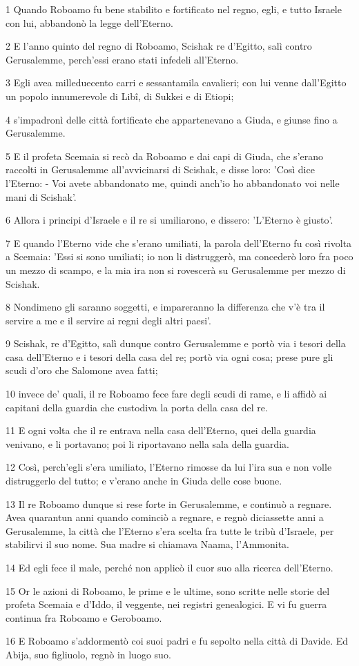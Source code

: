 \par 1 Quando Roboamo fu bene stabilito e fortificato nel regno, egli, e tutto Israele con lui, abbandonò la legge dell'Eterno.
\par 2 E l'anno quinto del regno di Roboamo, Scishak re d'Egitto, salì contro Gerusalemme, perch'essi erano stati infedeli all'Eterno.
\par 3 Egli avea milleduecento carri e sessantamila cavalieri; con lui venne dall'Egitto un popolo innumerevole di Libî, di Sukkei e di Etiopi;
\par 4 s'impadronì delle città fortificate che appartenevano a Giuda, e giunse fino a Gerusalemme.
\par 5 E il profeta Scemaia si recò da Roboamo e dai capi di Giuda, che s'erano raccolti in Gerusalemme all'avvicinarsi di Scishak, e disse loro: 'Così dice l'Eterno: - Voi avete abbandonato me, quindi anch'io ho abbandonato voi nelle mani di Scishak'.
\par 6 Allora i principi d'Israele e il re si umiliarono, e dissero: 'L'Eterno è giusto'.
\par 7 E quando l'Eterno vide che s'erano umiliati, la parola dell'Eterno fu così rivolta a Scemaia: 'Essi si sono umiliati; io non li distruggerò, ma concederò loro fra poco un mezzo di scampo, e la mia ira non si rovescerà su Gerusalemme per mezzo di Scishak.
\par 8 Nondimeno gli saranno soggetti, e impareranno la differenza che v'è tra il servire a me e il servire ai regni degli altri paesi'.
\par 9 Scishak, re d'Egitto, salì dunque contro Gerusalemme e portò via i tesori della casa dell'Eterno e i tesori della casa del re; portò via ogni cosa; prese pure gli scudi d'oro che Salomone avea fatti;
\par 10 invece de' quali, il re Roboamo fece fare degli scudi di rame, e li affidò ai capitani della guardia che custodiva la porta della casa del re.
\par 11 E ogni volta che il re entrava nella casa dell'Eterno, quei della guardia venivano, e li portavano; poi li riportavano nella sala della guardia.
\par 12 Così, perch'egli s'era umiliato, l'Eterno rimosse da lui l'ira sua e non volle distruggerlo del tutto; e v'erano anche in Giuda delle cose buone.
\par 13 Il re Roboamo dunque si rese forte in Gerusalemme, e continuò a regnare. Avea quarantun anni quando cominciò a regnare, e regnò diciassette anni a Gerusalemme, la città che l'Eterno s'era scelta fra tutte le tribù d'Israele, per stabilirvi il suo nome. Sua madre si chiamava Naama, l'Ammonita.
\par 14 Ed egli fece il male, perché non applicò il cuor suo alla ricerca dell'Eterno.
\par 15 Or le azioni di Roboamo, le prime e le ultime, sono scritte nelle storie del profeta Scemaia e d'Iddo, il veggente, nei registri genealogici. E vi fu guerra continua fra Roboamo e Geroboamo.
\par 16 E Roboamo s'addormentò coi suoi padri e fu sepolto nella città di Davide. Ed Abija, suo figliuolo, regnò in luogo suo.

